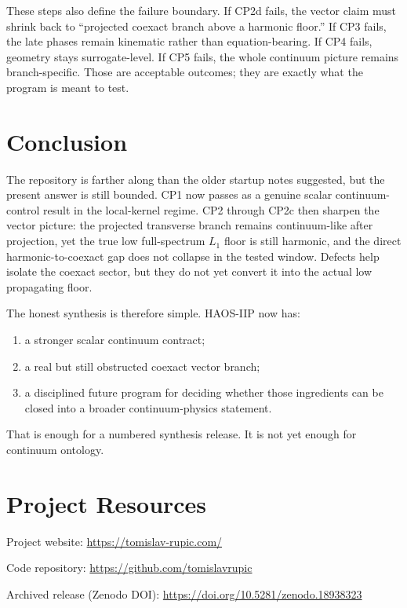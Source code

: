 \documentclass[11pt]{article}
\begin{document}
These steps also define the failure boundary. If CP2d fails, the vector claim must shrink back to ``projected coexact branch above a harmonic floor.'' If CP3 fails, the late phases remain kinematic rather than equation-bearing. If CP4 fails, geometry stays surrogate-level. If CP5 fails, the whole continuum picture remains branch-specific. Those are acceptable outcomes; they are exactly what the program is meant to test.

\section{Conclusion}

The repository is farther along than the older startup notes suggested, but the present answer is still bounded. CP1 now passes as a genuine scalar continuum-control result in the local-kernel regime. CP2 through CP2c then sharpen the vector picture: the projected transverse branch remains continuum-like after projection, yet the true low full-spectrum $L_1$ floor is still harmonic, and the direct harmonic-to-coexact gap does not collapse in the tested window. Defects help isolate the coexact sector, but they do not yet convert it into the actual low propagating floor.

The honest synthesis is therefore simple. HAOS-IIP now has:
\begin{enumerate}
\item a stronger scalar continuum contract;
\item a real but still obstructed coexact vector branch;
\item a disciplined future program for deciding whether those ingredients can be closed into a broader continuum-physics statement.
\end{enumerate}

That is enough for a numbered synthesis release. It is not yet enough for continuum ontology.

\section*{Project Resources}
Project website: \url{https://tomislav-rupic.com/}

Code repository: \url{https://github.com/tomislavrupic}

Archived release (Zenodo DOI): \url{https://doi.org/10.5281/zenodo.18938323}
\end{document}
